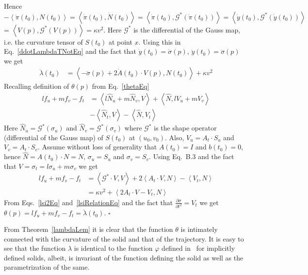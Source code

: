 \documentclass{elsart5p}
\begin{document}
{Hence $-\left < \ddot{\pi}(t_0), N(t_0) \right > =  \left< \dot{\pi}(t_0), \dot{N}(t_0) \right > =  \left< \dot{\pi}(t_0), \mathcal{G}^*(\dot{\pi}(t_0)) \right > = \left < \dot{y}(t_0), \mathcal{G}^*(\dot{y}(t_0)) \right>$ = $\left < V(p) , \mathcal{G}^*(V(p)) \right > =\kappa v^2$.  
Here $\mathcal{G}^*$ is the differential of the Gauss map, i.e. the curvature tensor of 
$S(t_0)$ at point $x$.  Using this in Eq.~\ref{ddotLambdaTNotEq} and the fact that  $\dot{y}(t_0) = \dot{\sigma}(p)$, $\ddot{y}(t_0) = \ddot{\sigma}(p)$ we get
\begin{align}
\ddot{\lambda}(t_0)  &= \left < -\ddot{\sigma}(p) + 2\dot{A}(t_0) \cdot V(p) , N(t_0) \right > + \kappa v^2  \label{lsi2Eq}
\end{align}
Recalling definition of $\theta(p)$ from Eq.~\ref{thetaEq}
\begin{align*}
l f_u + m f_v - f_t &= \left< l\hat{N}_u + m\hat{N}_v, V\right> + \left<\hat{N}, l V_u + m V_v \right >\\  &-  \left< \hat{N}_t, V\right > - \left<\hat{N} ,V_t \right >
\end{align*}
Here $\hat{N}_u = \mathcal{G}^*(\sigma_u)$ and $\hat{N}_v = \mathcal{G}^*(\sigma_v)$ 
where $\mathcal{G}^*$ is the shape operator (differential of the Gauss map) of $S(t_0)$ at $(u_0,v_0)$.  
Also, $V_u = A_t \cdot S_u$ and $V_v = A_t \cdot S_v$.  Assume without loss of generality that $A(t_0) = I$ 
and $b(t_0) = 0$, hence $\hat{N} = A(t_0) \cdot N = N$, $\sigma_u = S_u$ and $\sigma_v = S_v$. Using Eq.~B.3 and the fact that $V=\sigma_t = l\sigma_u+m\sigma_v$  we get
\begin{align}
\nonumber l f_u + m f_v - f_t &= \left< \mathcal{G}^* \cdot V, V \right > + 2\left<A_t \cdot V ,N \right> - \left <V_t, N\right >  \\
			& = \kappa v^2  + \left < 2A_t \cdot V - V_t  , N \right > \label{lsiRelationEq}
\end{align}
From Eqs.~\ref{lsi2Eq} and~\ref{lsiRelationEq} and the fact that $\frac{\partial \sigma}{\partial t^2}=V_t$ we get 
$\theta(p) = l f_u + m f_v - f_t = \ddot{\lambda}(t_0)$.
\hfill $\square$
}


From Theorem~\ref{lambdaLem}  it is clear that the function $\theta$ is
intimately connected with the curvature of the solid and that of the trajectory. 
It is easy to see that the function $\lambda$ is identical to the function 
$\varphi$ defined in~\cite{trimming} for implicitly defined solids, albeit, is invariant of the function defining the solid 
as well as the parametrization of the same.
\end{document}
